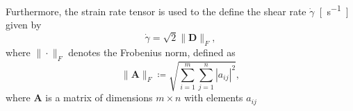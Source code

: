 Furthermore, the strain rate tensor is used to the define the shear rate $ \dot{\gamma} $~\si{[s^{-1}]} \cite{Cengel} given by
\begin{equation}\label{eq:dot gamma}
	\dot{\gamma} = \sqrt{2} \| \mathbf{D} \| _{F},
\end{equation}
where $ \| \cdot \| _{F} $ denotes the Frobenius norm, defined as
\begin{equation}
	\| \mathbf{A} \| _{F}  \coloneqq \sqrt{\sum_{i = 1}^{m} \sum_{j = 1}^{n} |a_{ij}|^2},
\end{equation}
where $ \mathbf{A} $ is a matrix of dimensions $ m \times n $ with elements $ a_{ij} $ 